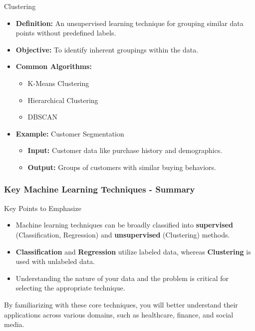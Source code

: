 \documentclass[aspectratio=169]{beamer}
\begin{document}
\begin{frame}[fragile]
  \begin{block}{Clustering}
    \begin{itemize}
      \item \textbf{Definition:} An unsupervised learning technique for grouping similar data points without predefined labels.
      \item \textbf{Objective:} To identify inherent groupings within the data.
      \item \textbf{Common Algorithms:}
      \begin{itemize}
        \item K-Means Clustering
        \item Hierarchical Clustering
        \item DBSCAN
      \end{itemize}
      \item \textbf{Example:} Customer Segmentation
        \begin{itemize}
          \item \textbf{Input:} Customer data like purchase history and demographics.
          \item \textbf{Output:} Groups of customers with similar buying behaviors.
        \end{itemize}
    \end{itemize}
  \end{block}
\end{frame}

\begin{frame}[fragile]
  \frametitle{Key Machine Learning Techniques - Summary}
  \begin{block}{Key Points to Emphasize}
    \begin{itemize}
      \item Machine learning techniques can be broadly classified into \textbf{supervised} (Classification, Regression) and \textbf{unsupervised} (Clustering) methods.
      \item \textbf{Classification} and \textbf{Regression} utilize labeled data, whereas \textbf{Clustering} is used with unlabeled data.
      \item Understanding the nature of your data and the problem is critical for selecting the appropriate technique.
    \end{itemize}
  \end{block}
  
  By familiarizing with these core techniques, you will better understand their applications across various domains, such as healthcare, finance, and social media.
\end{frame}
\end{document}
